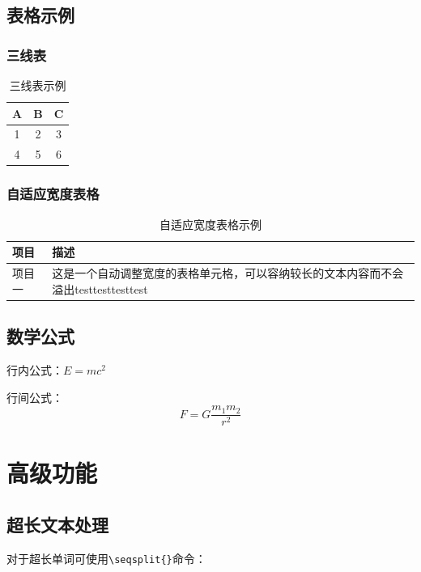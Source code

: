 \documentclass[12pt]{ctexart}
\begin{document}
\begin{sloppypar}
\subsection{表格示例}

\subsubsection{三线表}
\begin{table}[H]
    \centering
    \caption{三线表示例}
    \label{tab:example}
    \begin{tabular}{ccc}
        \toprule
        \textbf{A} & \textbf{B} & \textbf{C} \\
        \midrule
        1 & 2 & 3 \\
        4 & 5 & 6 \\
        \bottomrule
    \end{tabular}
\end{table}

\subsubsection{自适应宽度表格}
\begin{table}[H]
    \centering
    \caption{自适应宽度表格示例}
    \label{tab:adaptive}
    \begin{tabularx}{\textwidth}{|l|X|}
        \hline
        \textbf{项目} & \textbf{描述} \\
        \hline
        项目一 & 这是一个自动调整宽度的表格单元格，可以容纳较长的文本内容而不会溢出testtesttesttest \\
        \hline
    \end{tabularx}
\end{table}

\subsection{数学公式}
行内公式：$E=mc^2$

行间公式：
\begin{equation}
    F = G\frac{m_1 m_2}{r^2}
\end{equation}

\section{高级功能}
\subsection{超长文本处理}
对于超长单词可使用\verb|\seqsplit{}|命令：


\end{sloppypar}
\end{document}
